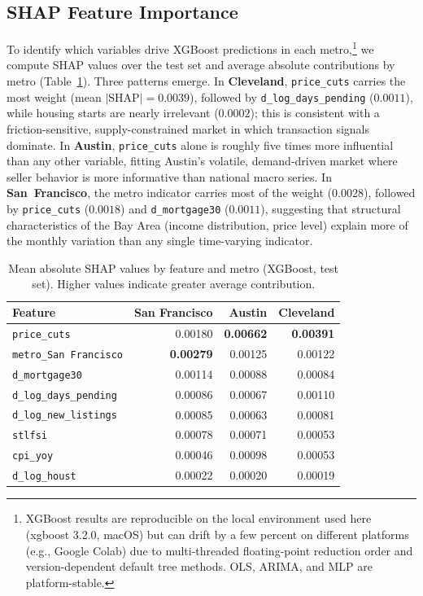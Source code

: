 \documentclass[12pt]{article}
\begin{document}
\subsection{SHAP Feature Importance}

To identify which variables drive XGBoost predictions in each metro,\footnote{XGBoost results are reproducible on the local environment used here (xgboost 3.2.0, macOS) but can drift by a few percent on different platforms (e.g., Google Colab) due to multi-threaded floating-point reduction order and version-dependent default tree methods. OLS, ARIMA, and MLP are platform-stable.} we compute SHAP values over the test set and average absolute contributions by metro (Table~\ref{tab:shap}). Three patterns emerge. In \textbf{Cleveland}, \texttt{price\_cuts} carries the most weight (mean $|\text{SHAP}|=0.0039$), followed by \texttt{d\_log\_days\_pending} ($0.0011$), while housing starts are nearly irrelevant ($0.0002$); this is consistent with a friction-sensitive, supply-constrained market in which transaction signals dominate. In \textbf{Austin}, \texttt{price\_cuts} alone is roughly five times more influential than any other variable, fitting Austin's volatile, demand-driven market where seller behavior is more informative than national macro series. In \textbf{San~Francisco}, the metro indicator carries most of the weight ($0.0028$), followed by \texttt{price\_cuts} ($0.0018$) and \texttt{d\_mortgage30} ($0.0011$), suggesting that structural characteristics of the Bay Area (income distribution, price level) explain more of the monthly variation than any single time-varying indicator.

\begin{table}[H]
\centering
\caption{Mean absolute SHAP values by feature and metro (XGBoost, test set). Higher values indicate greater average contribution.}
\label{tab:shap}
\begin{tabular}{lrrr}
\hline
Feature & San Francisco & Austin & Cleveland \\
\hline
\texttt{price\_cuts}           & 0.00180 & \textbf{0.00662} & \textbf{0.00391} \\
\texttt{metro\_San Francisco}  & \textbf{0.00279} & 0.00125 & 0.00122 \\
\texttt{d\_mortgage30}         & 0.00114 & 0.00088 & 0.00084 \\
\texttt{d\_log\_days\_pending} & 0.00086 & 0.00067 & 0.00110 \\
\texttt{d\_log\_new\_listings} & 0.00085 & 0.00063 & 0.00081 \\
\texttt{stlfsi}                & 0.00078 & 0.00071 & 0.00053 \\
\texttt{cpi\_yoy}              & 0.00046 & 0.00098 & 0.00053 \\
\texttt{d\_log\_houst}         & 0.00022 & 0.00020 & 0.00019 \\
\hline
\end{tabular}
\end{table}
\end{document}
